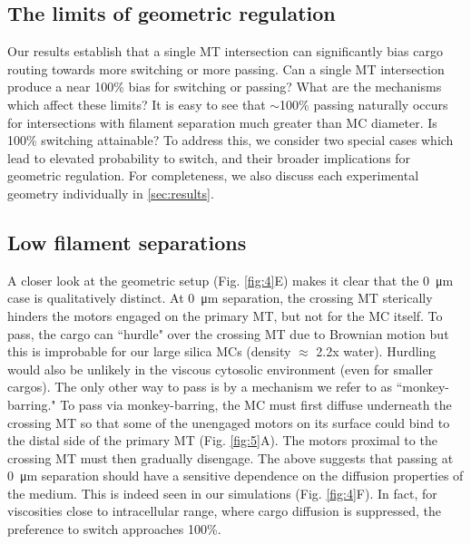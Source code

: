 \subsection{The limits of geometric regulation}

Our results establish that a single MT intersection can significantly bias cargo routing towards more switching or more passing. Can a single MT intersection produce a near 100\% bias for switching or passing? What are the mechanisms which affect these limits? It is easy to see that $\sim$100\% passing naturally occurs for intersections with filament separation much greater than MC diameter. Is 100\% switching attainable? To address this, we consider two special cases which lead to elevated probability to switch, and their broader implications for geometric regulation. For completeness, we also discuss each experimental geometry individually in \ref{sec:results}.

\subsection{Low filament separations}

A closer look at the geometric setup (Fig. \ref{fig:4}E) makes it clear that the \SI{0}{\micro\meter} case is qualitatively distinct. At \SI{0}{\micro\meter} separation, the crossing MT sterically hinders the motors engaged on the primary MT, but not for the MC itself. To pass, the cargo can ``hurdle" over the crossing MT due to Brownian motion but this is improbable for our large silica MCs (density $\approx$ 2.2x water). Hurdling would also be unlikely in the viscous cytosolic environment (even for smaller cargos). The only other way to pass is by a mechanism we refer to as ``monkey-barring." To pass via monkey-barring, the MC must first diffuse underneath the crossing MT so that some of the unengaged motors on its surface could bind to the distal side of the primary MT (Fig. \ref{fig:5}A). The motors proximal to the crossing MT must then gradually disengage. The above suggests that passing at \SI{0}{\micro\meter} separation should have a sensitive dependence on the diffusion properties of the medium. This is indeed seen in our simulations (Fig. \ref{fig:4}F). In fact, for viscosities close to intracellular range, where cargo diffusion is suppressed, the preference to switch approaches 100\%.

